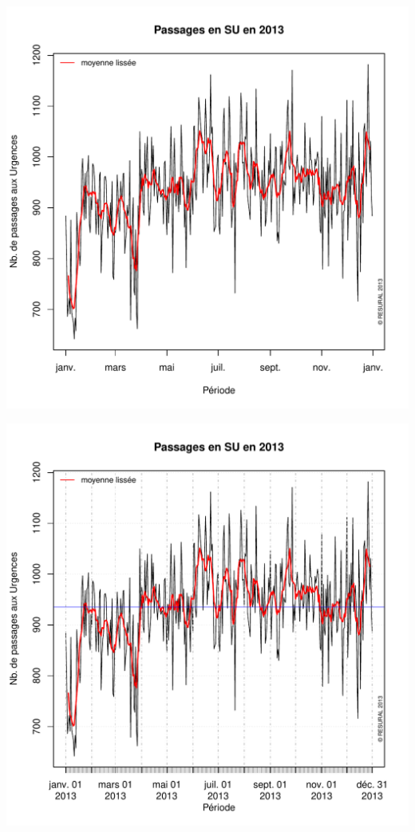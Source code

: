 \documentclass[12pt,english,french,twoside]{book}\usepackage[]{graphicx}\usepackage[]{color}
\makeatletter
\def\maxwidth{ %
  \ifdim\Gin@nat@width>\linewidth
    \linewidth
  \else
    \Gin@nat@width
  \fi
}
\newenvironment{knitrout}{}{} %
\makeatother
\begin{document}
\begin{knitrout}
\color{fgcolor}
\includegraphics[width=\maxwidth]{figure/activite_plot} 

\end{knitrout}

\begin{knitrout}
\color{fgcolor}
\includegraphics[width=\maxwidth]{figure/activite_plot2} 

\end{knitrout}
\end{document}
